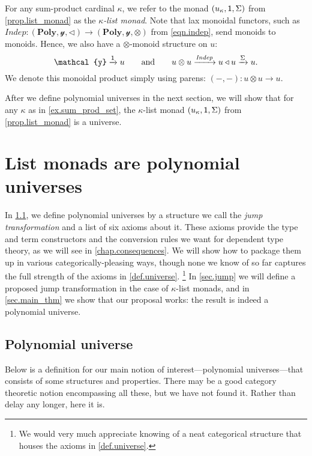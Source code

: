 \documentclass[11pt, one side, article]{memoir}
\theoremstyle{definition}
\theoremstyle{plain}
\newenvironment{definition}
  {\pushQED{\qed}\renewcommand{\qedsymbol}{$\lozenge$}\definitionx}
  {\popQED\enddefinitionx}
\newcommand{\Cat}[1]{\mathbf{#1}}%
\newcommand{\Fun}[1]{\mathit{#1}}%
\newcommand{\To}[2][]{\xrightarrow[#1]{#2}}
\newcommand{\yon}{\mathcal{y}}
\newcommand{\poly}{\Cat{Poly}}
\newcommand{\0}{\textsf{0}}
\newcommand{\1}{\tn{\textsf{1}}}
\newcommand{\tri}{\mathbin{\triangleleft}}
\newcommand{\indep}{\Fun{Indep}}
\newcommand{\qqand}{\qquad\text{and}\qquad}
\begin{document}
\begin{definition}[$\kappa$-list monads]
For any sum-product cardinal $\kappa$, we refer to the monad $(u_\kappa,\1,\Sigma)$ from \cref{prop.list_monad} as the \emph{$\kappa$-list monad}. Note that lax monoidal functors, such as $\indep\colon(\poly,\yon,\tri)\to(\poly,\yon,\otimes)$ from \eqref{eqn.indep}, send monoids to monoids. Hence, we also have a $\otimes$-monoid structure on $u$:
\begin{equation}\label{eqn.otimes_monoid}
	\yon\To{\1} u
	\qqand
	u\otimes u\To{\indep} u\tri u\To{\Sigma}u.
\end{equation}
We denote this monoidal product simply using parens: $(-,-)\colon u\otimes u\to u$.
\end{definition}

After we define polynomial universes in the next section, we will show that for any $\kappa$ as in \cref{ex.sum_prod_set}, the $\kappa$-list monad $(u_\kappa,\1,\Sigma)$ from \cref{prop.list_monad} is a universe.

\chapter{List monads are polynomial universes}

In \cref{sec.poly_universe}, we define polynomial universes by a structure we call the \emph{jump transformation} and a list of six axioms about it. These axioms provide the type and term constructors and the conversion rules we want for dependent type theory, as we will see in \cref{chap.consequences}. We will show how to package them up in various categorically-pleasing ways, though none we know of so far captures the full strength of the axioms in \cref{def.universe}.%
\footnote{We would very much appreciate knowing of a neat categorical structure that houses the axioms in \cref{def.universe}.}
In \cref{sec.jump} we will define a proposed jump transformation in the case of $\kappa$-list monads, and in \cref{sec.main_thm} we show that our proposal works: the result is indeed a polynomial universe.
 

\section{Polynomial universe}\label{sec.poly_universe}

Below is a definition for our main notion of interest---polynomial universes---that consists of some structures and properties. There may be a good category theoretic notion encompassing all these, but we have not found it. Rather than delay any longer, here it is.
\end{document}
